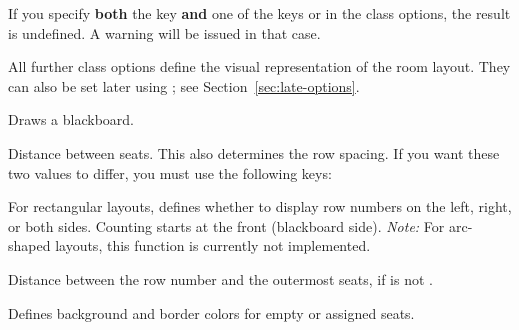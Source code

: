 \documentclass[
babel-options={english},
load-preamble-,
title=compact
]{cnltx-doc}
\begin{document}

If you specify \textbf{both} the  key \textbf{and} one of the keys
 or  in the class options, the result is undefined.
A warning will be issued in that case.\medskip


All further class options define the visual representation of the room layout.
They can also be set later using ; see Section~\ref{sec:late-options}.

\begin{options}
  Draws a blackboard.

  \Default{2pt}
  Distance between seats. This also determines the row spacing.
  If you want these two values to differ, you must use the following keys:

  \Default*{2pt}\vspace{-.3\baselineskip}
  \Default{2pt}

  For rectangular layouts, defines whether to display row numbers on the left, right, or both sides.
  Counting starts at the front (blackboard side).\newline
  \emph{Note:} For arc-shaped layouts, this function is currently not implemented.

  \Default{2pt}
  Distance between the row number and the outermost seats,
  if  is not .

  \vspace{-.3\baselineskip}
  \vspace{-.3\baselineskip}
  \vspace{-.3\baselineskip}
  Defines background and border colors for empty or assigned seats.
\end{options}
\end{document}
